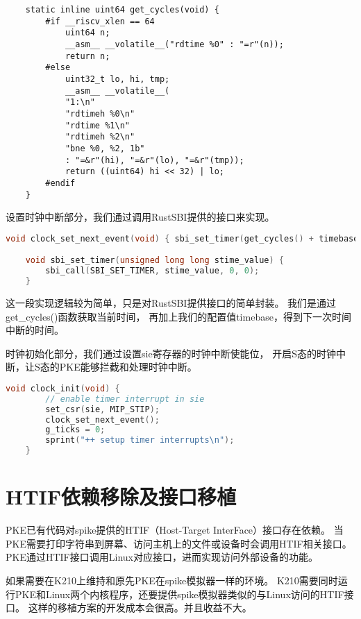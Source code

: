 \begin{lstlisting}
    static inline uint64 get_cycles(void) {
        #if __riscv_xlen == 64
            uint64 n;
            __asm__ __volatile__("rdtime %0" : "=r"(n));
            return n;
        #else
            uint32_t lo, hi, tmp;
            __asm__ __volatile__(
            "1:\n"
            "rdtimeh %0\n"
            "rdtime %1\n"
            "rdtimeh %2\n"
            "bne %0, %2, 1b"
            : "=&r"(hi), "=&r"(lo), "=&r"(tmp));
            return ((uint64) hi << 32) | lo;
        #endif
    }    
\end{lstlisting}

设置时钟中断部分，我们通过调用RustSBI提供的接口来实现。

\begin{lstlisting}[caption={设置时钟中断}, label={lst:set_clock_interrupt}, language=C]
    void clock_set_next_event(void) { sbi_set_timer(get_cycles() + timebase); }

    void sbi_set_timer(unsigned long long stime_value) {
        sbi_call(SBI_SET_TIMER, stime_value, 0, 0);
    }  
\end{lstlisting}

这一段实现逻辑较为简单，只是对RustSBI提供接口的简单封装。
我们是通过get\_cycles()函数获取当前时间，
再加上我们的配置值timebase，得到下一次时间中断的时间。

时钟初始化部分，我们通过设置sie寄存器的时钟中断使能位，
开启S态的时钟中断，让S态的PKE能够拦截和处理时钟中断。

\begin{lstlisting}[caption={时钟初始化}, label={lst:clock_init}, language=C]
    void clock_init(void) {
        // enable timer interrupt in sie
        set_csr(sie, MIP_STIP);
        clock_set_next_event();
        g_ticks = 0;
        sprint("++ setup timer interrupts\n");
    }    
\end{lstlisting}

\section{HTIF依赖移除及接口移植}

PKE已有代码对spike提供的HTIF（Host-Target InterFace）接口存在依赖。
当PKE需要打印字符串到屏幕、访问主机上的文件或设备时会调用HTIF相关接口。
PKE通过HTIF接口调用Linux对应接口，进而实现访问外部设备的功能\cite{2019Porting}。

如果需要在K210上维持和原先PKE在spike模拟器一样的环境。
K210需要同时运行PKE和Linux两个内核程序，还要提供spike模拟器类似的与Linux访问的HTIF接口。
这样的移植方案的开发成本会很高。并且收益不大。

